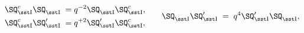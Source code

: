 \begin{equation}\begin{aligned}
\SQ_{\rm\sst I}^c\SQ_{\rm\sst I}^{}\;=& \;q^{-2}\SQ_{\rm\sst I}^{}\SQ_{\rm\sst I}^c,\\
\SQ_{\rm\sst I}^c\SQ_{\rm\sst I}'\;=& \;q^{+2}\SQ_{\rm\sst I}'\SQ_{\rm\sst I}^c,
\end{aligned}\qquad \SQ_{\rm\sst I}^{}\SQ_{\rm\sst I}'\;=\;q^4\SQ_{\rm\sst I}'\SQ_{\rm\sst I}^{},
\end{equation}

